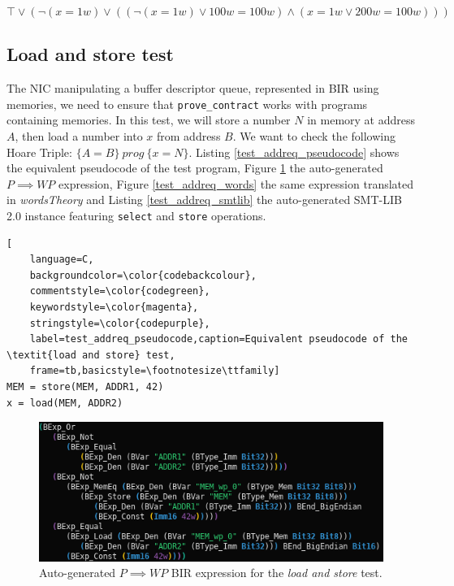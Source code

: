\documentclass{kththesis}
\newcommand{\htriple}[3]{\ensuremath{\{#1\}~#2~\{#3\}}}
\newcommand{\WP}{\ensuremath{\mathit{WP}}}
\begin{document}
{\begin{equation}
    \top \lor
    (\neg(x = 1w) \lor ((\neg(x = 1w) \lor 100w = 100w) \land (x = 1w \lor 200w = 100w)))
    \label{test_cjmp_words}
\end{equation}

\subsection{Load and store test} \label{addreq_test}

The \gls{NIC} manipulating a buffer descriptor queue, represented in BIR using memories, we need to ensure that \texttt{prove\_contract} works with programs containing memories. In this test, we will store a number $N$ in memory at address $A$, then load a number into $x$ from address $B$. We want to check the following Hoare Triple: \htriple{A=B}{prog}{x=N}. Listing \ref{test_addreq_pseudocode} shows the equivalent pseudocode of the test program, Figure \ref{test_addreq_bir} the auto-generated $P \implies \WP$ expression, Figure \ref{test_addreq_words} the same expression translated in \textit{wordsTheory} and Listing \ref{test_addreq_smtlib} the auto-generated SMT-LIB 2.0 instance featuring \texttt{select} and \texttt{store} operations.

\begin{lstlisting}[
    language=C,
    backgroundcolor=\color{codebackcolour},
    commentstyle=\color{codegreen},
    keywordstyle=\color{magenta},
    stringstyle=\color{codepurple},
    label=test_addreq_pseudocode,caption=Equivalent pseudocode of the \textit{load and store} test,
    frame=tb,basicstyle=\footnotesize\ttfamily]
MEM = store(MEM, ADDR1, 42)
x = load(MEM, ADDR2)
\end{lstlisting}

\begin{figure}[!h]
	\includegraphics[width=\textwidth]{figures/test_addreq_bir.png}
	\centering
	\caption{Auto-generated $P \implies \WP$ BIR expression for the \textit{load and store} test.}
	\label{test_addreq_bir}
\end{figure}

}
\end{document}
